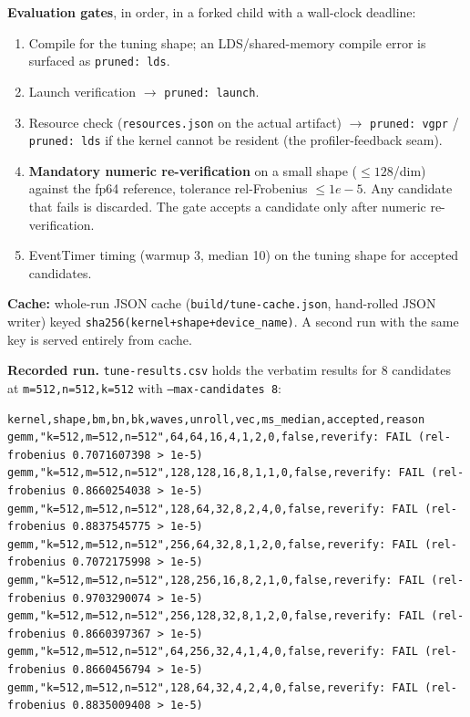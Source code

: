\documentclass[10pt,twoside]{article}
\begin{document}
\textbf{Evaluation gates}, in order, in a forked child with a wall-clock deadline:
\begin{enumerate}
  \item Compile for the tuning shape; an LDS/shared-memory compile error is surfaced as
        \texttt{pruned: lds}.
  \item Launch verification $\to$ \texttt{pruned: launch}.
  \item Resource check (\texttt{resources.json} on the actual artifact) $\to$
        \texttt{pruned: vgpr} / \texttt{pruned: lds} if the kernel cannot be resident
        (the profiler-feedback seam).
  \item \textbf{Mandatory numeric re-verification} on a small shape ($\le 128$/dim) against
        the fp64 reference, tolerance rel-Frobenius $\le 1e-5$. Any candidate that fails is
        discarded. The gate accepts a candidate only after numeric re-verification.
  \item EventTimer timing (warmup 3, median 10) on the tuning shape for accepted candidates.
\end{enumerate}

\textbf{Cache:} whole-run JSON cache (\texttt{build/tune-cache.json}, hand-rolled JSON
writer) keyed \texttt{sha256(kernel+shape+device\_name)}. A second run with the same key is
served entirely from cache.

\textbf{Recorded run.} \texttt{tune-results.csv} holds the verbatim results for 8
candidates at \texttt{m=512,n=512,k=512} with \texttt{--max-candidates 8}:

\begin{lstlisting}[caption={Autotune results: a negative result
(\texttt{tune-results.csv}).},label={lst:tune},basicstyle=\ttfamily\scriptsize,
                   breaklines=true,breakatwhitespace=false,
                   postbreak=\mbox{\textcolor{red}{$\hookrightarrow$}\space}]
kernel,shape,bm,bn,bk,waves,unroll,vec,ms_median,accepted,reason
gemm,"k=512,m=512,n=512",64,64,16,4,1,2,0,false,reverify: FAIL (rel-frobenius 0.7071607398 > 1e-5)
gemm,"k=512,m=512,n=512",128,128,16,8,1,1,0,false,reverify: FAIL (rel-frobenius 0.8660254038 > 1e-5)
gemm,"k=512,m=512,n=512",128,64,32,8,2,4,0,false,reverify: FAIL (rel-frobenius 0.8837545775 > 1e-5)
gemm,"k=512,m=512,n=512",256,64,32,8,1,2,0,false,reverify: FAIL (rel-frobenius 0.7072175998 > 1e-5)
gemm,"k=512,m=512,n=512",128,256,16,8,2,1,0,false,reverify: FAIL (rel-frobenius 0.9703290074 > 1e-5)
gemm,"k=512,m=512,n=512",256,128,32,8,1,2,0,false,reverify: FAIL (rel-frobenius 0.8660397367 > 1e-5)
gemm,"k=512,m=512,n=512",64,256,32,4,1,4,0,false,reverify: FAIL (rel-frobenius 0.8660456794 > 1e-5)
gemm,"k=512,m=512,n=512",128,64,32,4,2,4,0,false,reverify: FAIL (rel-frobenius 0.8835009408 > 1e-5)
\end{lstlisting}
\end{document}
